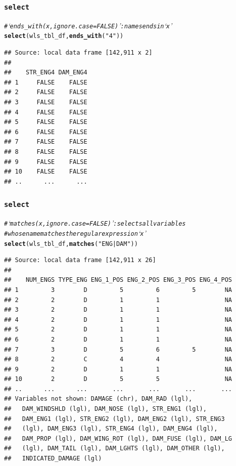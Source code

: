 \documentclass{beamer}\usepackage[]{graphicx}\usepackage[]{color}
\makeatletter
\newcommand{\hlstr}[1]{\textcolor[rgb]{0.192,0.494,0.8}{#1}}%
\newcommand{\hlcom}[1]{\textcolor[rgb]{0.678,0.584,0.686}{\textit{#1}}}%
\newcommand{\hlstd}[1]{\textcolor[rgb]{0.345,0.345,0.345}{#1}}%
\newcommand{\hlkwd}[1]{\textcolor[rgb]{0.737,0.353,0.396}{\textbf{#1}}}%
\newenvironment{kframe}{%
 \def\at@end@of@kframe{}%
 \ifinner\ifhmode%
  \def\at@end@of@kframe{\end{minipage}}%
  \begin{minipage}{\columnwidth}%
 \fi\fi%
 \def\FrameCommand##1{\hskip\@totalleftmargin \hskip-\fboxsep
 \colorbox{shadecolor}{##1}\hskip-\fboxsep
     \hskip-\linewidth \hskip-\@totalleftmargin \hskip\columnwidth}%
 \MakeFramed {\advance\hsize-\width
   \@totalleftmargin\z@ \linewidth\hsize
   \@setminipage}}%
 {\par\unskip\endMakeFramed%
 \at@end@of@kframe}
\newenvironment{knitrout}{}{} %
\makeatother
\begin{document}
\begin{frame}[fragile]
  \frametitle{{\tt select}}
\begin{knitrout}\footnotesize
{}\color{fgcolor}\begin{kframe}
\begin{alltt}
\hlcom{# ‘ends_with(x, ignore.case = FALSE)’: names ends in ‘x’}
\hlkwd{select}\hlstd{(wls_tbl_df,} \hlkwd{ends_with}\hlstd{(}\hlstr{"4"}\hlstd{))}
\end{alltt}
\begin{verbatim}
## Source: local data frame [142,911 x 2]
## 
##    STR_ENG4 DAM_ENG4
## 1     FALSE    FALSE
## 2     FALSE    FALSE
## 3     FALSE    FALSE
## 4     FALSE    FALSE
## 5     FALSE    FALSE
## 6     FALSE    FALSE
## 7     FALSE    FALSE
## 8     FALSE    FALSE
## 9     FALSE    FALSE
## 10    FALSE    FALSE
## ..      ...      ...
\end{verbatim}
\end{kframe}
\end{knitrout}
\end{frame} 

\begin{frame}[fragile]
  \frametitle{{\tt select}}
\begin{knitrout}\footnotesize
{}\color{fgcolor}\begin{kframe}
\begin{alltt}
\hlcom{# ‘matches(x, ignore.case = FALSE)’: selects all variables}
\hlcom{# whose name matches the regular expression ‘x’}
\hlkwd{select}\hlstd{(wls_tbl_df,} \hlkwd{matches}\hlstd{(}\hlstr{"ENG|DAM"}\hlstd{))}
\end{alltt}
\begin{verbatim}
## Source: local data frame [142,911 x 26]
## 
##    NUM_ENGS TYPE_ENG ENG_1_POS ENG_2_POS ENG_3_POS ENG_4_POS
## 1         3        D         5         6         5        NA
## 2         2        D         1         1                  NA
## 3         2        D         1         1                  NA
## 4         2        D         1         1                  NA
## 5         2        D         1         1                  NA
## 6         2        D         1         1                  NA
## 7         3        D         5         6         5        NA
## 8         2        C         4         4                  NA
## 9         2        D         1         1                  NA
## 10        2        D         5         5                  NA
## ..      ...      ...       ...       ...       ...       ...
## Variables not shown: DAMAGE (chr), DAM_RAD (lgl),
##   DAM_WINDSHLD (lgl), DAM_NOSE (lgl), STR_ENG1 (lgl),
##   DAM_ENG1 (lgl), STR_ENG2 (lgl), DAM_ENG2 (lgl), STR_ENG3
##   (lgl), DAM_ENG3 (lgl), STR_ENG4 (lgl), DAM_ENG4 (lgl),
##   DAM_PROP (lgl), DAM_WING_ROT (lgl), DAM_FUSE (lgl), DAM_LG
##   (lgl), DAM_TAIL (lgl), DAM_LGHTS (lgl), DAM_OTHER (lgl),
##   INDICATED_DAMAGE (lgl)
\end{verbatim}
\end{kframe}
\end{knitrout}
\end{frame} 
\end{document}
